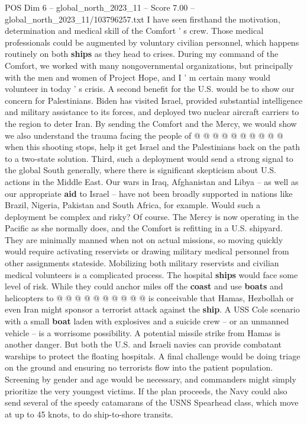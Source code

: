 \begin{textsample}{POS Dim 6 – global\_north\_2023\_11 – Score 7.00 – global\_north\_2023\_11/103796257.txt}
I have seen firsthand the motivation, determination and medical skill of the Comfort ' s crew.
Those medical professionals could be augmented by voluntary civilian personnel, which happens routinely on both \textbf{ships} as they head to crises.
During my command of the Comfort, we worked with many nongovernmental organizations, but principally with the men and women of Project Hope, and I ' m certain many would volunteer in today ' s crisis.
A second benefit for the U.S. would be to show our concern for Palestinians.
Biden has visited Israel, provided substantial intelligence and military assistance to its forces, and deployed two nuclear aircraft carriers to the region to deter Iran.
By sending the Comfort and the Mercy, we would show we also understand the trauma facing the people of @ @ @ @ @ @ @ @ @ @ when this shooting stops, help it get Israel and the Palestinians back on the path to a two-state solution.
Third, such a deployment would send a strong signal to the global South generally, where there is significant skepticism about U.S. actions in the Middle East.
Our wars in Iraq, Afghanistan and Libya -- as well as our appropriate \textbf{aid} to Israel -- have not been broadly supported in nations like Brazil, Nigeria, Pakistan and South Africa, for example.
Would such a deployment be complex and risky?
Of course.
The Mercy is now operating in the Pacific as she normally does, and the Comfort is refitting in a U.S. shipyard.
They are minimally manned when not on actual missions, so moving quickly would require activating reservists or drawing military medical personnel from other assignments stateside.
Mobilizing both military reservists and civilian medical volunteers is a complicated process.
The hospital \textbf{ships} would face some level of risk.
While they could anchor miles off the \textbf{coast} and use \textbf{boats} and helicopters to @ @ @ @ @ @ @ @ @ @ is conceivable that Hamas, Hezbollah or even Iran might sponsor a terrorist attack against the \textbf{ship}.
A USS Cole scenario with a small \textbf{boat} laden with explosives and a suicide crew -- or an unmanned vehicle -- is a worrisome possibility.
A potential missile strike from Hamas is another danger.
But both the U.S. and Israeli navies can provide combatant warships to protect the floating hospitals.
A final challenge would be doing triage on the ground and ensuring no terrorists flow into the patient population.
Screening by gender and age would be necessary, and commanders might simply prioritize the very youngest victims.
If the plan proceeds, the Navy could also send several of the speedy catamarans of the USNS Spearhead class, which move at up to 45 knots, to do ship-to-shore transits.

\end{textsample}
